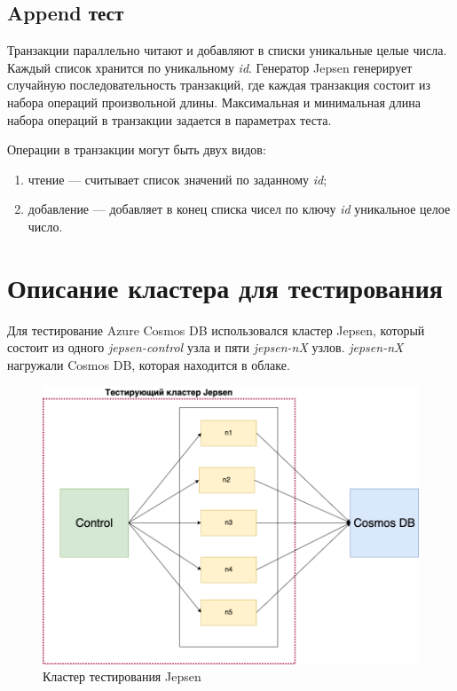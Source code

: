 \documentclass[12pt,  openany]{book}
\begin{document}
\subsection{Append тест}
\par Транзакции параллельно читают и добавляют в списки уникальные целые числа. Каждый список хранится по уникальному \textit{id}.  Генератор Jepsen генерирует случайную последовательность транзакций, где каждая транзакция состоит из набора операций произвольной длины. Максимальная и минимальная длина набора операций в транзакции задается в параметрах теста. 
\par Операции в транзакции могут быть двух видов:
\begin{enumerate}
\item чтение --- считывает список значений по заданному \textit{id};
\item добавление --- добавляет в конец списка чисел по ключу \textit{id} уникальное целое число.
\end{enumerate}

\section{Описание кластера для тестирования}
Для тестирование Azure Cosmos DB использовался кластер Jepsen, который состоит из одного \textit{jepsen-control} узла и пяти \textit{jepsen-nX} узлов.  \textit{jepsen-nX} нагружали Cosmos DB,  которая находится в облаке.

\begin{figure}[H]
  \includegraphics[width=\textwidth]{nodes-jepsen.png}
  \caption{Кластер тестирования Jepsen}
\end{figure}
\end{document}

